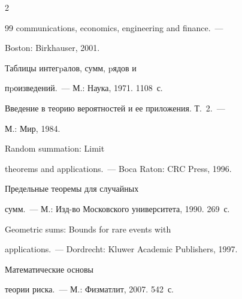 \begin{multicols}{2}
{{\begin{thebibliography}{99}
communications, economics, engineering and finance.~---


 Boston: Birkhauser, 2001.


 






Таблицы интегpалов, сумм, pядов и


пpоизведений.~---  М.: Наука, 1971. 1108~с.









Введение в теорию вероятностей и ее приложения. Т.~2.~---


М.: Мир, 1984.









Random summation: Limit


theorems and applications.~--- Boca Raton: CRC Press, 1996.


 






Предельные теоремы для случайных


сумм.~---  М.: Изд-во Московского университета, 1990. 269~с.









Geometric sums: Bounds for rare events with


applications.~--- Dordrecht: Kluwer Academic Publishers, 1997.









Математические основы


теории риска.~---  М.: Физматлит, 2007. 542~с.








\end{thebibliography}}}
\end{multicols}
